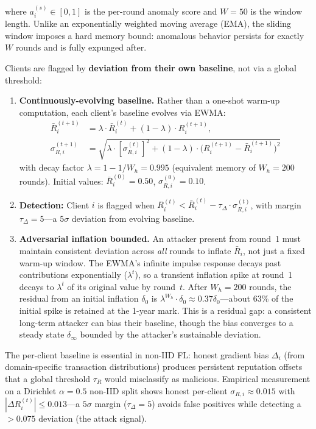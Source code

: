 \documentclass[10pt,journal]{IEEEtran}
\begin{document}
where $a_i^{(s)} \in [0,1]$ is the per-round anomaly score and $W=50$ is the window length. Unlike an exponentially weighted moving average (EMA), the sliding window imposes a hard memory bound: anomalous behavior persists for exactly $W$ rounds and is fully expunged after.

\noindent Clients are flagged by \textbf{deviation from their own baseline}, not via a global threshold:

\begin{enumerate}
  \item \textbf{Continuously-evolving baseline.} Rather than a one-shot warm-up computation, each client's baseline evolves via EWMA:
  \begin{equation}
  \begin{split}
  \bar{R}_i^{(t+1)} &= \lambda \cdot \bar{R}_i^{(t)} + (1 - \lambda) \cdot R_i^{(t+1)},\\[2pt]
  \sigma_{R,i}^{(t+1)} &= \sqrt{\lambda \cdot [\sigma_{R,i}^{(t)}]^2 + (1 - \lambda) \cdot \bigl(R_i^{(t+1)} - \bar{R}_i^{(t+1)}\bigr)^2}
  \end{split}
  \label{eq:ewma-baseline}
  \end{equation}
  with decay factor $\lambda = 1 - 1/W_h = 0.995$ (equivalent memory of $W_h = 200$ rounds). Initial values: $\bar{R}_i^{(0)} = 0.50$, $\sigma_{R,i}^{(0)} = 0.10$.
  \item \textbf{Detection:} Client $i$ is flagged when $R_i^{(t)} < \bar{R}_i^{(t)} - \tau_\Delta \cdot \sigma_{R,i}^{(t)}$, with margin $\tau_\Delta = 5$---a $5\sigma$ deviation from evolving baseline.
  \item \textbf{Adversarial inflation bounded.} An attacker present from round~1 must maintain consistent deviation across \textit{all} rounds to inflate $\bar{R}_i$, not just a fixed warm-up window. The EWMA's infinite impulse response decays past contributions exponentially ($\lambda^t$), so a transient inflation spike at round~1 decays to $\lambda^t$ of its original value by round~$t$. After $W_h = 200$ rounds, the residual from an initial inflation $\delta_0$ is $\lambda^{W_h} \cdot \delta_0 \approx 0.37\delta_0$---about 63\% of the initial spike is retained at the 1-year mark. This is a residual gap: a consistent long-term attacker can bias their baseline, though the bias converges to a steady state $\delta_\infty$ bounded by the attacker's sustainable deviation.
\end{enumerate}

\noindent The per-client baseline is essential in non-IID FL: honest gradient bias $\Delta_i$ (from domain-specific transaction distributions) produces persistent reputation offsets that a global threshold $\tau_R$ would misclassify as malicious. Empirical measurement on a Dirichlet $\alpha=0.5$ non-IID split shows honest per-client $\sigma_{R,i} \approx 0.015$ with $|\Delta R_i^{(t)}| \le 0.013$---a $5\sigma$ margin ($\tau_\Delta = 5$) avoids false positives while detecting a $>0.075$ deviation (the attack signal).
\end{document}
